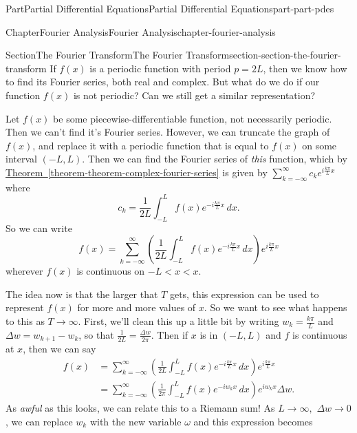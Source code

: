 \documentclass[twoside,10pt,]{book}
\newcommand{\xreffont}{\relax}
\numberwithin{equation}{part}
\newcommand{\lt}{<}
\newcommand{\amp}{&}
\begin{document}
\begin{partptx}{Part}{Partial Differential Equations}{}{Partial Differential Equations}{}{}{part-part-pdes}
\begin{chapterptx}{Chapter}{Fourier Analysis}{}{Fourier Analysis}{}{}{chapter-fourier-analysis}
%
%
\typeout{************************************************}
\typeout{************************************************}
%
\begin{sectionptx}{Section}{The Fourier Transform}{}{The Fourier Transform}{}{}{section-section-the-fourier-transform}
If \(f(x)\) is a periodic function with period \(p=2L\), then we know how to find its Fourier series, both real and complex. But what do we do if our function \(f(x)\) is not periodic? Can we still get a similar representation?%
\par
Let \(f(x)\) be some piecewise-differentiable function, not necessarily periodic. Then we can't find it's Fourier series. However, we can truncate the graph of \(f(x)\), and replace it with a periodic function that is equal to \(f(x)\) on some interval \((-L,L)\). Then we can find the Fourier series of \emph{this} function, which by \hyperref[theorem-theorem-complex-fourier-series]{Theorem~{\xreffont\ref{theorem-theorem-complex-fourier-series}}} is given by \(\sum_{k=-\infty}^{\infty}c_{k}e^{i\frac{k\pi}{L}x}\) where%
\begin{equation*}
c_{k} = \frac{1}{2L}\int_{-L}^{L}f(x)e^{-i\frac{k\pi}{L}x}\,dx.
\end{equation*}
So we can write%
\begin{equation*}
f(x) = \sum_{k=-\infty}^{\infty}\left(\frac{1}{2L}\int_{-L}^{L}f(x)e^{-i\frac{k\pi}{L}x}\,dx\right)e^{i\frac{k\pi}{L}x}
\end{equation*}
wherever \(f(x)\) is continuous on \(-L \lt x \lt x\).%
\par
The idea now is that the larger that \(T\) gets, this expression can be used to represent \(f(x)\) for more and more values of \(x\). So we want to see what happens to this as \(T\to\infty\). First, we'll clean this up a little bit by writing \(w_{k} = \frac{k\pi}{L}\) and \(\Delta w = w_{k+1} - w_{k}\), so that \(\frac{1}{2L} = \frac{\Delta w}{2\pi}\). Then if \(x\) is in \((-L,L)\) and \(f\) is continuous at \(x\), then we can say%
\begin{align*}
f(x) \amp = \sum_{k=-\infty}^{\infty}\left(\frac{1}{2L}\int_{-L}^{L}f(x)e^{-i\frac{k\pi}{L}x}\,dx\right)e^{i\frac{k\pi}{L}x} \\
\amp = \sum_{k=-\infty}^{\infty}\left(\frac{1}{2\pi}\int_{-L}^{L}f(x)e^{-iw_{k}x}\,dx\right)e^{iw_{k}x}\Delta w. 
\end{align*}
As \emph{awful} as this looks, we can relate this to a Riemann sum! As \(L\to\infty,\) \(\Delta w\to0\), we can replace \(w_{k}\) with the new variable \(\omega\) and this expression becomes%

\end{sectionptx}
\end{chapterptx}
\end{partptx}
\end{document}
